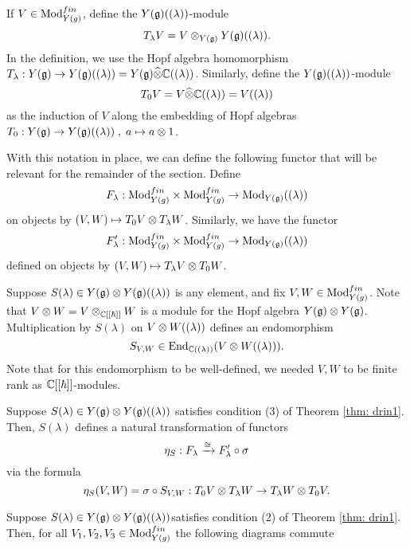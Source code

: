 \documentclass[11pt]{amsart}
\begin{document}
\begin{dfn}
If $V \in {\rm Mod}_{Y(g)}^{fin}$, define the $Y(\mathfrak g)((\lambda))$-module
\[
T_\lambda V = V \otimes_{Y(\mathfrak g)} Y(\mathfrak g)((\lambda)) .
\]
In the definition, we use the Hopf algebra homomorphism $T_\lambda : Y(\mathfrak g) \to Y(\mathfrak g)((\lambda)) = Y(\mathfrak g) \widehat{\otimes} \mathbb C((\lambda))$. 
Similarly, define the $Y(\mathfrak g)((\lambda))$-module
\[
T_0 V = V \widehat{\otimes} \mathbb C((\lambda)) = V((\lambda))
\]
as the induction of $V$ along the embedding of Hopf algebras $T_0 : Y(\mathfrak g) \to Y(\mathfrak g)((\lambda)) \;, \; a \mapsto a \otimes 1$. 
\end{dfn}

With this notation in place, we can define the following functor that will be relevant for the remainder of the section. 
Define
\begin{equation}\label{functor}
F_\lambda : {\rm Mod}_{Y(g)}^{fin} \times {\rm Mod}_{Y(g)}^{fin} \to {\rm Mod}_{Y(\mathfrak g)}((\lambda))
\end{equation}
on objects by $(V, W) \mapsto T_0 V \otimes T_\lambda W$.
Similarly, we have the functor
\[
F'_\lambda : {\rm Mod}_{Y(g)}^{fin} \times {\rm Mod}_{Y(g)}^{fin} \to {\rm Mod}_{Y(\mathfrak g)}((\lambda))
\]
defined on objects by $(V, W) \mapsto T_\lambda V \otimes T_0 W$.

\begin{con}
Suppose $S(\lambda) \in Y(\mathfrak g) \otimes Y(\mathfrak g)((\lambda))$ is any element,
and fix $V, W \in {\rm Mod}_{Y(g)}^{fin}$. 
Note that $V \otimes W = V \otimes_{\mathbb C[[\hbar]]} W$ is a module for the Hopf algebra $Y(\mathfrak g) \otimes Y(\mathfrak g)$. 
Multiplication by $S(\lambda)$ on $V \otimes W ((\lambda))$ defines an endomorphism
\[
S_{V,W} \in {\rm End}_{\mathbb C((\lambda))} (V \otimes W((\lambda))) .
\]
Note that for this endomorphism to be well-defined, we needed $V,W$ to be finite rank as $\mathbb C[[\hbar]]$-modules.
\end{con}

\begin{lem}\label{lem: R1}
Suppose $S(\lambda) \in Y(\mathfrak g) \otimes Y(\mathfrak g)((\lambda))$ satisfies condition (3) of Theorem \ref{thm: drin1}. 
Then, $S(\lambda)$ defines a natural transformation of functors
\[
\eta_{S} : F_\lambda \xrightarrow{\cong} F'_\lambda \circ \sigma
\]
via the formula
\[
\eta_S (V,W) = \sigma \circ S_{V,W} : T_0 V \otimes T_\lambda W \to T_\lambda W \otimes T_0 V.
\]
\end{lem}

\begin{lem}
Suppose $S(\lambda) \in Y(\mathfrak g) \otimes Y(\mathfrak g)((\lambda))$satisfies condition (2) of Theorem \ref{thm: drin1}. 
Then, for all $V_1,V_2,V_3 \in {\rm Mod}_{Y(g)}^{fin}$ the following diagrams commute 
\end{lem}
\end{document}

